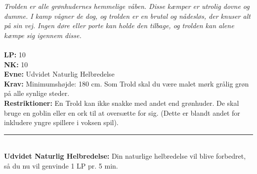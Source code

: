 \begin{race*}
\textit{Trolden er alle grønhudernes hemmelige våben. Disse kæmper er utrolig dovne og dumme. I kamp vågner de dog, og trolden er en brutal og nådesløs, der knuser alt på sin vej. Ingen døre eller porte kan holde den tilbage, og trolden kan alene kæmpe sig igennem disse.}\\
\\
\textbf{LP:} 10\\ 
\textbf{NK:} 10\\ 
\textbf{Evne:} Udvidet Naturlig Helbredelse\\
\textbf{Krav:} Minimumshøjde: 180 cm. Som Trold skal du være malet mørk grålig grøn på alle synlige steder.\\
\textbf{Restriktioner:} En Trold kan ikke snakke med andet end grønhuder. De skal bruge en goblin eller en ork til at oversætte for sig. (Dette er blandt andet for inkludere yngre spillere i voksen spil).\\
\rule{\textwidth}{0.4pt}\\
\textbf{Udvidet Naturlig Helbredelse:} Din naturlige helbredelse vil blive forbedret, så du nu vil genvinde 1 LP pr. 5 min.\\
\end{race*}